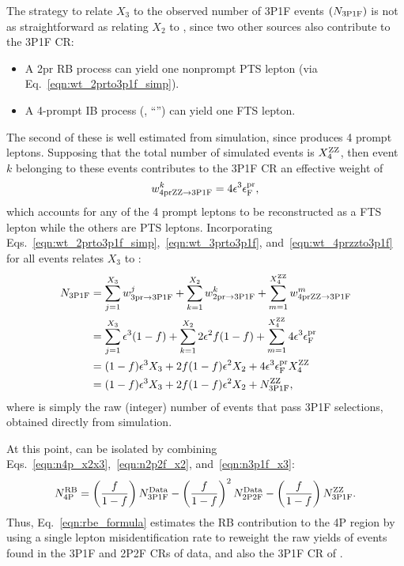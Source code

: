 The strategy to relate $X_3$ to the observed number of 3P1F events $\left( N_{\mathrm{3P1F}} \right)$ is not as straightforward as relating $X_2$ to \twoPtwoFexp,
since two other sources also contribute to the 3P1F CR:
\begin{itemize}
	\item A 2pr RB process can yield one nonprompt PTS lepton (via Eq.~\ref{eqn:wt_2prto3p1f_simp}).
	\item A 4-prompt IB process (\qqggZZfourl, ``\ZZ'') can yield one FTS lepton.
\end{itemize}
The second of these is well estimated from simulation, since \ZZ produces 4 prompt leptons.
Supposing that the total number of simulated \ZZ events is $X_4^{\mathrm{Z}\mathrm{Z}}$, then event $k$ belonging to these events contributes to the 3P1F CR an effective weight of
\begin{equation}
	\label{eqn:wt_4przzto3p1f}
	w^k_{\mathrm{4prZZ \to 3P1F}} = 4 \epsilon^3 \epsilon^{\mathrm{pr}}_\mathrm{F},
\end{equation}
which accounts for any of the 4 prompt leptons to be reconstructed as a FTS lepton while the others are PTS leptons.
Incorporating Eqs.~\ref{eqn:wt_2prto3p1f_simp},~\ref{eqn:wt_3prto3p1f}, and~\ref{eqn:wt_4przzto3p1f} for all events relates $X_3$ to \threePoneFexp:
\begin{align}
	\label{eqn:n3p1f_x3}
	N_{\mathrm{3P1F}}
	&= \sum_{j=1}^{X_{3}} w^{j}_{\mathrm{3pr \to 3P1F}} + \sum_{k=1}^{X_{2}} w^{k}_{\mathrm{2pr \to 3P1F}} + \sum_{m=1}^{X_4^{\mathrm{Z}\mathrm{Z}}} w^m_{\mathrm{4prZZ \to 3P1F}}
	\notag
	\\
	&= \sum_{j=1}^{X_{3}} \epsilon^3 (1-f) + \sum_{k=1}^{X_{2}} 2 \epsilon^2 f (1-f) + \sum_{m=1}^{X_4^{\mathrm{Z}\mathrm{Z}}} 4 \epsilon^3 \epsilon^{\mathrm{pr}}_\mathrm{F}
	\notag
	\\
	&= (1-f) \epsilon^3 X_{3} + 2 f (1-f) \epsilon^2 X_{2} + 4 \epsilon^3 \epsilon^{\mathrm{pr}}_\mathrm{F} X_4^{\mathrm{Z}\mathrm{Z}}
	\notag
	\\
	&= (1-f) \epsilon^3 X_{3} + 2 f (1-f) \epsilon^2 X_{2} + N_{\mathrm{3P1F}}^{\mathrm{Z}\mathrm{Z}},
\end{align}
where \threePoneFzz is simply the raw (integer) number of \ZZ events that pass 3P1F selections, obtained directly from simulation.

At this point, \fourPexp can be isolated by combining Eqs.~\ref{eqn:n4p_x2x3},~\ref{eqn:n2p2f_x2}, and~\ref{eqn:n3p1f_x3}:
\begin{equation}
	\label{eqn:rbe_formula}
	N_{\mathrm{4P}}^{\mathrm{RB}} =
	\left( \frac{f}{1-f} \right) N_{\mathrm{3P1F}}^{\mathrm{Data}} -
	\left( \frac{f}{1-f} \right)^2 N_{\mathrm{2P2F}}^{\mathrm{Data}} - 
	\left( \frac{f}{1-f} \right) N_{\mathrm{3P1F}}^{\mathrm{Z}\mathrm{Z}}.
\end{equation}
Thus, Eq.~\ref{eqn:rbe_formula} estimates the RB contribution to the 4P region by using a single lepton misidentification rate to reweight the raw yields of events found in the 3P1F and 2P2F CRs of data, and also the 3P1F CR of \ZZ.

